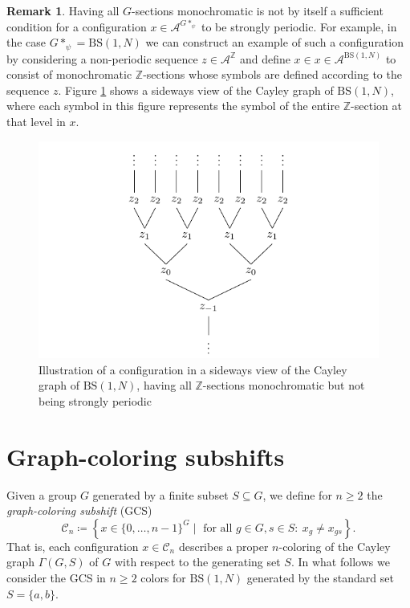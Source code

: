 \documentclass[letterpaper,11pt,reqno]{amsart}
\theoremstyle{plain}
\theoremstyle{definition}
\newtheorem{remark}{Remark}
\newcommand{\BS}[1][N]{\mathrm{BS}(1,#1)}
\begin{document}
\begin{remark} Having all $G$-sections monochromatic is not by itself a sufficient condition for a configuration $x\in \mathcal{A}^{G*_{\psi}}$ to be strongly periodic. For example, in the case $G*_{\psi}=\BS$ we can construct an example of such a configuration by considering a non-periodic sequence $z\in \mathcal{A}^\mathbb{Z}$ and define $x\in x\in \mathcal{A}^{\BS}$ to consist of monochromatic $\mathbb{Z}$-sections whose symbols are defined according to the sequence $z$. Figure \ref{fig:monochromatic_rows_tree_counterexample} shows a sideways view of the Cayley graph of $\BS$, where each symbol in this figure represents the symbol of the entire $\mathbb{Z}$-section at that level in $x$.
	\begin{figure}
		\centering
		\includegraphics{tree_aperiodic.pdf}
		\caption{Illustration of a configuration in a sideways view of the Cayley graph of $\BS$, having all $\mathbb{Z}$-sections monochromatic but not being strongly periodic}
		\label{fig:monochromatic_rows_tree_counterexample}
	\end{figure}
\end{remark}



\section{Graph-coloring subshifts}\label{section:graph_coloring_subshifts}
Given a group $G$ generated by a finite subset $S\subseteq G$, we define for $n\ge 2$ the \textit{graph-coloring subshift} (GCS)
$$
\mathcal{C}_{n}\coloneqq\left\{x\in \{0,\ldots,n-1\}^G\mid \text{ for all } g\in G, s\in S: \ x_{g}\neq x_{gs} \right\}.
$$
That is, each configuration $x\in \mathcal{C}_{n}$ describes a proper $n$-coloring of the Cayley graph $\Gamma(G,S)$ of $G$ with respect to the generating set $S$. In what follows we consider the GCS in $n\ge 2$ colors for $\BS$ generated by the standard set $S=\{a,b\}$.
\end{document}

